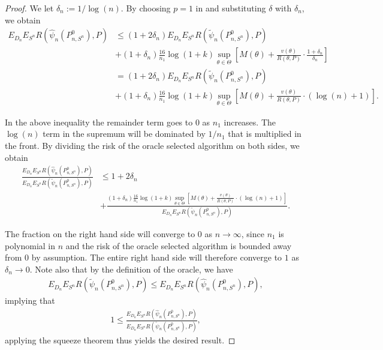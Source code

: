 \documentclass[11pt, a4paper]{article}
\theoremstyle{definition}
\theoremstyle{remark}
\newcommand{\btheta}{\theta}
\newcommand{\la}{\psi}
\newcommand{\Sn}{S^n}
\begin{document}
\begin{proof}
    We let $ \delta_n := 1/\log(n) $.  By choosing $ p = 1 $ in  and substituting $ \delta $ with $ \delta_n $, we obtain
    \begin{align*}
        E_{D_n} E_{\Sn} R(\hat{\la}_n(P_{n, \Sn}^{0}), P) &\leq(1 + 2 \delta_n) E_{D_n} E_{\Sn} R(\tilde{\la}_n(P_{n,\Sn}^{0}), P)\\
                                                        &+(1 + \delta_n) \frac{16}{n_1} \log (1 +k) \sup_{\btheta \in \Theta} \left[ M(\theta) + \frac{v(\theta)}{R(\theta, P)} \cdot \frac{1 + \delta_n}{\delta_n}  \right]\\
                                                        &= (1 + 2 \delta_n) E_{D_n} E_{\Sn} R(\tilde{\la}_n(P_{n,\Sn}^{0}), P)\\
                                                        &+(1 + \delta_n) \frac{16}{n_1} \log (1 +k) \sup_{\btheta \in \Theta} \left[ M(\theta) + \frac{v(\theta)}{R(\theta, P)} \cdot (\log(n) + 1) \right].
    \end{align*}

    In the above inequality the remainder term goes to $ 0 $ as $ n_1 $ increases. The $ \log(n) $ term in the supremum will be dominated by $ 1/n_1 $ that is multiplied in the front. By dividing the risk of the oracle selected algorithm on both sides, we obtain
    \begin{align*}
        \frac{E_{D_n} E_{\Sn} R(\hat{\la}_n(P_{n, \Sn}^{0}), P)}{E_{D_n} E_{\Sn} R(\tilde{\la}_n(P_{n,\Sn}^{0}), P)} 
        &\leq 1 + 2 \delta_n\\
        &+\frac{(1 + \delta_n)\frac{16}{n_1} \log (1 +k) \sup_{\btheta \in \Theta} \left[ M(\theta) + \frac{v(\theta)}{R(\theta , P)} \cdot (\log(n) + 1) \right]}{E_{D_n} E_{\Sn} R( \tilde{\la}_n(P_{n,\Sn}^{0}), P)}.
    \end{align*}

    The fraction on the right hand side will converge to $ 0 $ as $ n \to \infty $, since $ n_1 $ is polynomial in $ n $ and the risk of the oracle selected algorithm is bounded away from $ 0 $ by assumption. The entire right hand side will therefore converge to $ 1 $ as $ \delta_n \to 0 $. Note also that by the definition of the oracle, we have 
    \begin{align*}
        E_{D_n} E_{\Sn} R(\tilde{\la}_n(P_{n,\Sn}^{0}), P) \leq E_{D_n} E_{\Sn} R(\hat{\la}_n(P_{n,\Sn}^{0}), P),
    \end{align*}
    implying that 
        \begin{align*}
            1 \leq \frac{E_{D_n} E_{\Sn} R(\hat{\la}_n(P_{n, \Sn}^{0}), P)}{E_{D_n} E_{\Sn} R(\tilde{\la}_n(P_{n,\Sn}^{0}), P)}, 
    \end{align*}
    applying the squeeze theorem thus yields the desired result.         
\end{proof}
\end{document}
